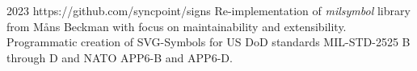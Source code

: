 \cventry
{2023}
{https://github.com/syncpoint/signs}
{}
{}
{}
{
  Re-implementation of \emph{milsymbol} library from Måns Beckman with focus on
  maintainability and extensibility.
  Programmatic creation of SVG-Symbols for US DoD standards MIL-STD-2525 B through D and
  NATO APP6-B and APP6-D.
}
